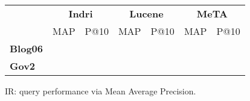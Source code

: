 \begin{figure}[t]
\centering
{\small
\begin{tabular}{|l|cc|cc|cc|}
    \hline &
    \multicolumn{2}{c|}{\textbf{Indri}} &
    \multicolumn{2}{c|}{\textbf{Lucene}} &
    \multicolumn{2}{c|}{\textbf{MeTA}} \\
    & MAP & P@10 & MAP & P@10 & MAP & P@10\\
    \hline
    \textbf{Blog06} & & & & & & \\
    \textbf{Gov2} & & & & & & \\
    \hline
\end{tabular}
}
\caption{IR: query performance via Mean Average Precision.}
\label{fig:ir-map}
\end{figure}
